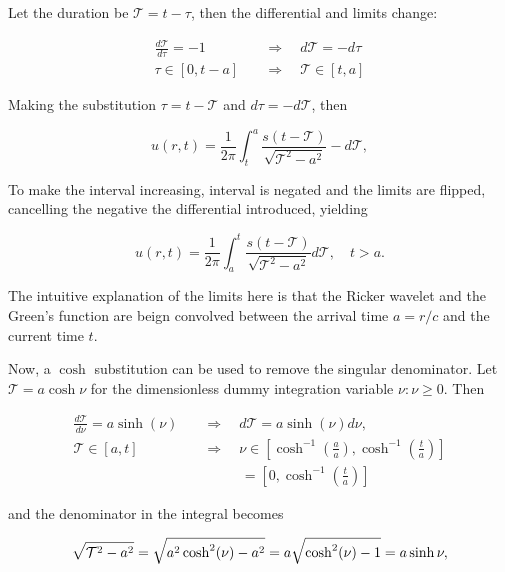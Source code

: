\documentclass[final-report]{report-template}
\begin{document}
Let the duration be $\mathcal{T} = t - \tau$, then the differential and limits change:

\begin{align*}
    \frac{d\mathcal{T}}{d\tau} = -1 &\quad \Longrightarrow \quad d\mathcal{T} = -d\tau\\
    \tau \in [0, t-a] &\quad \Longrightarrow \quad  \mathcal{T} \in [t, a]
\end{align*}

Making the substitution $\tau = t - \mathcal{T}$ and $d\tau = -d\mathcal{T}$, then

\begin{equation}
    u(r, t) = \frac{1}{2\pi} \int^{a}_t \frac{s(t-\mathcal{T})}{\sqrt{\mathcal{T}^2 - a^2}} -d\mathcal{T},
\end{equation}

To make the interval increasing, interval is negated and the limits are flipped, cancelling the negative the differential introduced, yielding

\begin{equation}
    u(r, t) = \frac{1}{2\pi} \int^t_a \frac{s(t-\mathcal{T})}{\sqrt{\mathcal{T}^2 - a^2}} d\mathcal{T}, \quad t > a.
\end{equation}

The intuitive explanation of the limits here is that the Ricker wavelet and the Green's function are beign convolved between the arrival time $a = r/c$ and the current time $t$.

Now, a $\cosh$ substitution can be used to remove the singular denominator. Let $\mathcal{T} = a\cosh{\nu}$ for the dimensionless dummy integration variable $\nu: \nu \geq 0$. Then

\begin{align}
    \frac{d\mathcal{T}}{d\nu} = a\sinh(\nu) \quad &\Rightarrow \quad d\mathcal{T} = a\sinh(\nu) d\nu,\\
    \mathcal{T} \in [a, t] \quad &\Rightarrow \quad \nu \in \left[\cosh^{-1}\left(\frac{a}{a}\right), \cosh^{-1}\left(\frac{t}{a}\right)\right] \\ & \qquad \ \ \ = \left[0, \cosh^{-1}\left(\frac{t}{a}\right)\right] 
\end{align}

and the denominator in the integral becomes

\begin{equation}
    \sqrt{\mathcal{T}^2 - a^2} = \sqrt{a^2\cosh^2(\nu) - a^2}  = a\sqrt{\cosh^2(\nu) - 1}\\
    = a\sinh{\nu},
\end{equation}
\end{document}
